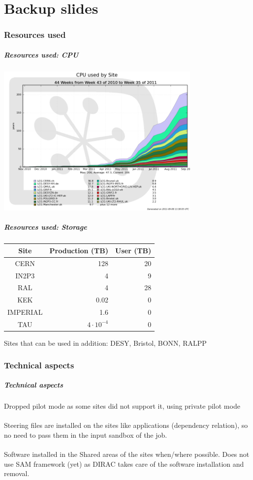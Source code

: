 \documentclass{beamer}
\begin{document}
\appendix
\part{Backup slides}
\begin{frame}
\partpage 
\end{frame}
\section{Resources used}
\begin{frame}
\frametitle{Resources used: CPU}
 \includegraphics[width=10cm]{CPUperSiteForProd}
\end{frame}
\begin{frame}
\frametitle{Resources used: Storage} 
\begin{center}
\begin{tabular}{crr}
\toprule
Site & Production (TB) & User (TB) \\
\midrule
CERN & 128 & 20\\
IN2P3 & 4 & 9\\
RAL & 4 & 28\\
KEK & 0.02 & 0\\
IMPERIAL& 1.6 & 0 \\
TAU & $4\cdot 10^{-4}$ & 0\\
\bottomrule
\end{tabular}
\end{center}
Sites that can be used in addition: DESY, Bristol, BONN, RALPP
\end{frame}
\section{Technical aspects}
\begin{frame}
\frametitle{Technical aspects}
Dropped pilot mode as some sites did not support it, using private pilot mode\\
~\\
Steering files are installed on the sites like applications (dependency relation), so no need to pass them in the input sandbox of the job.\\
~\\
Software installed in the Shared areas of the sites when/where possible. Does not use SAM framework (yet) as DIRAC takes care of the software installation and removal. 
\end{frame}
\end{document}
